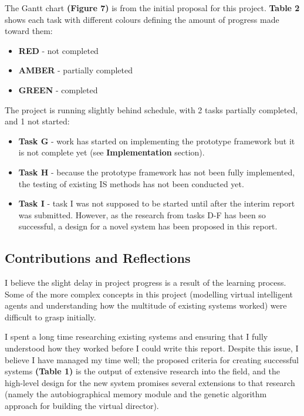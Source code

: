 \documentclass{sig-alternate-05-2015}
\begin{document}
\noindent The Gantt chart \textbf{(Figure 7)} is from the initial proposal for this project. \textbf{Table 2} shows each task with different colours
defining the amount of progress made toward them:
\begin{itemize}
	\item \color{red} \textbf{RED} \color{black} - not completed
	\item \color{orange} \textbf{AMBER} \color{black} - partially completed
	\item \color{green} \textbf{GREEN} \color{black} - completed
\end{itemize}

\newline The project is running slightly behind schedule, with 2 tasks partially completed, and 1 not started:
\begin{itemize}
	\item \textbf{Task G} - work has started on implementing the prototype framework but it is not complete yet (see \textbf{Implementation} section).
	\item \textbf{Task H} - because the prototype framework has not been fully implemented, the testing of existing IS methods has not been conducted yet.
	\item \textbf{Task I} - task I was not supposed to be started until after the interim report was submitted. However, as the research from tasks D-F has been so successful, a design for a novel system has been proposed in this report. 
\end{itemize}

\subsection{Contributions and Reflections}

I believe the slight delay in project progress is a result of the learning process. Some of the more complex concepts in this project (modelling virtual intelligent agents and understanding how the multitude of existing systems worked) were difficult to grasp initially. 

I spent a long time researching existing systems and ensuring that I fully understood how they worked before I could write this report. Despite this issue, I believe I have managed my time well; the proposed criteria for creating successful systems \textbf{(Table 1)} is the output of extensive research into the field, and the high-level design for the new system promises several extensions to that research (namely the autobiographical memory module and the genetic algorithm approach for building the virtual director). \\
\end{document}
